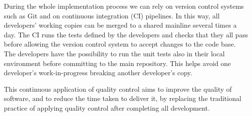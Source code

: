 \documentclass[../../main.tex]{subfiles}
\begin{document}
During the whole implementation process we can rely on version control systems such as Git and on continuous integration (CI) pipelines. 
In this way, all developers' working copies can be merged to a shared mainline several times a day. 
The CI runs the tests defined by the developers and checks that they all pass before allowing the version control system to accept changes to the code base.
The developers have the possibility to run the unit tests also in their local environment before committing to the main repository. 
This helps avoid one developer's work-in-progress breaking another developer's copy. 

This continuous application of quality control aims to improve the quality of software, and to reduce the time taken to deliver it, by replacing the traditional practice of applying quality control after completing all development.
\end{document}
